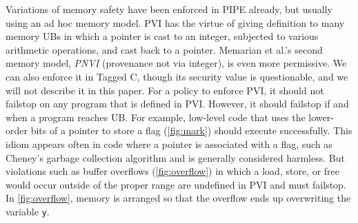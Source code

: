 \documentclass{llncs}
\begin{document}
Variations of memory safety have been enforced in PIPE already, but usually using
an ad hoc memory model. PVI has the virtue of giving definition to many memory UBs in which a pointer is
cast to an integer, subjected to various arithmetic operations, and cast back to a pointer.
Memarian et al.'s second memory model, {\it PNVI} (provenance not via integer), is even more permissive.
We can also enforce it in Tagged C, though its security value is questionable, and we will
not describe it in this paper.
For a policy to enforce PVI, it should not failstop on any program that is defined in PVI.
However, it should failstop if and when a program reaches UB. For example, low-level code
that uses the lower-order bits of a pointer to store a flag (\cref{fig:mark}) should
execute successfully. This idiom appears often in code where a pointer is associated with a flag,
such as Cheney's garbage collection algorithm \cite{} and is generally considered harmless.
But violations such as buffer overflows (\cref{fig:overflow}) in which a load, store, or free would
occur outside of the proper range are undefined in PVI and must failstop. In \cref{fig:overflow},
memory is arranged so that the overflow ends up overwriting the variable {\tt y}.
\end{document}
